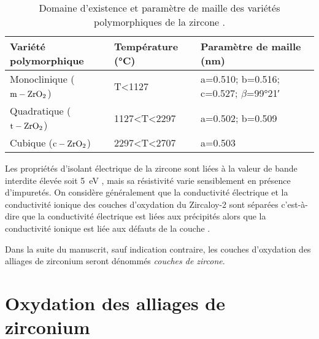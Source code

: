 \begin{refsection}
    \begin{table}[H]
        \begin{small}
        \centering
        \begin{tabular}{p{} p{} p{}}
        \toprule
        \textbf{Variété polymorphique}    & \textbf{Température (°C)} & \textbf{Paramètre de maille (nm)} \\
        \midrule
        Monoclinique ($\rm m-ZrO_2$)      & T<1127    & a=0.510; b=0.516; c=0.527; $\beta$=99\si{\degree}21\si{\arcminute}      \\
        Quadratique ($\rm t-ZrO_2$)      & 1127<T<2297    & a=0.502; b=0.509 \\
        Cubique ($\rm c-ZrO_2$)      & 2297<T<2707    & a=0.503 \\
        \bottomrule
        \end{tabular}
        \caption[Domaine d'existence et paramètre de maille des variétés polymorphiques de la zircone.]
        {Domaine d'existence et paramètre de maille des variétés polymorphiques de la zircone \citep{Zhao2002}.}
        \label{tab:zirconia_allotropic_forms}
        \end{small}
	\end{table}

    Les propriétés d'isolant électrique de la zircone sont liées à la valeur de bande
    interdite élevée soit 5~eV \citep{Benaboud2007, Morrison1980}, mais sa résistivité varie sensiblement en présence
    d'impuretés.
    On considère généralement que la conductivité électrique et la conductivité ionique des couches d'oxydation du
    Zircaloy-2 sont séparées c'est-à-dire que la conductivité électrique est liées aux précipités alors
    que la conductivité ionique est liée aux défauts de la couche \citep{IAEA1998}. 

    Dans la suite du manuscrit, sauf indication contraire, les couches d'oxydation des alliages de zirconium seront
    dénommés \emph{couches de zircone}. 
    

	
\newpage
\section{Oxydation des alliages de zirconium}\label{sec:oxidation_zirconium}


\end{refsection}
